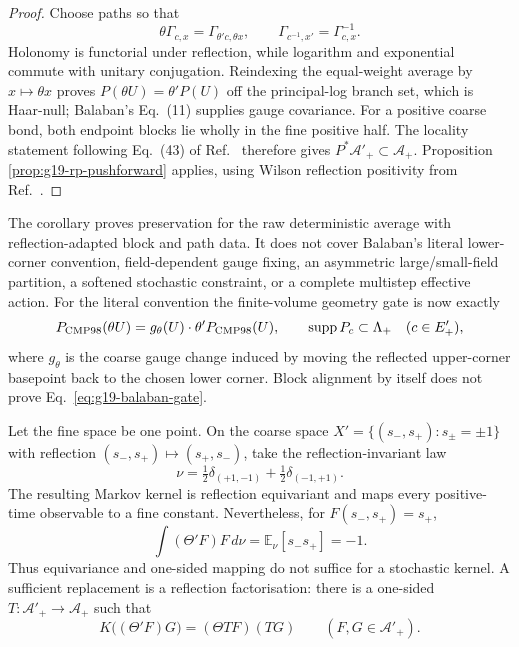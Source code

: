 \begin{proof}
Choose paths so that
\[
 \theta\Gamma_{c,x}=\Gamma_{\theta'c,\theta x},
 \qquad \Gamma_{c^{-1},x'}=\Gamma_{c,x}^{-1}.
\]
Holonomy is functorial under reflection, while logarithm and exponential
commute with unitary conjugation.  Reindexing the equal-weight average by
$x\mapsto\theta x$ proves $P(\theta U)=\theta'P(U)$ off the principal-log
branch set, which is Haar-null; Balaban's Eq.~(11) supplies gauge covariance.
For a positive coarse bond, both endpoint blocks lie wholly in the fine
positive half.  The locality statement following Eq.~(43) of
Ref.~\cite{Balaban1985Averaging} therefore gives
$P^*\mathcal A'_+\subset\mathcal A_+$.  Proposition
\ref{prop:g19-rp-pushforward} applies, using Wilson reflection positivity from
Ref.~\cite{OsterwalderSeiler1978}.
\end{proof}

The corollary proves preservation for the raw deterministic average with
reflection-adapted block and path data.  It does not cover Balaban's literal
lower-corner convention, field-dependent gauge fixing, an asymmetric
large/small-field partition, a softened stochastic constraint, or a complete
multistep effective action.  For the literal convention the finite-volume
geometry gate is now exactly
\begin{equation}
 P_{\rm CMP98}(\theta U)
 =g_\theta(U)\cdot\theta'P_{\rm CMP98}(U),
 \qquad
 \operatorname{supp}P_c\subset\Lambda_+
 \quad(c\in E'_+),
 \label{eq:g19-balaban-gate}
\end{equation}
where $g_\theta$ is the coarse gauge change induced by moving the reflected
upper-corner basepoint back to the chosen lower corner.  Block alignment by
itself does not prove Eq.~\eqref{eq:g19-balaban-gate}.

\begin{remark}
\label{rem:g19-markov-counterexample}
Let the fine space be one point.  On the coarse space
$X'=\{(s_-,s_+):s_\pm=\pm1\}$ with reflection
$(s_-,s_+)\mapsto(s_+,s_-)$, take the reflection-invariant law
\[
 \nu=\tfrac12\delta_{(+1,-1)}+\tfrac12\delta_{(-1,+1)}.
\]
The resulting Markov kernel is reflection equivariant and maps every
positive-time observable to a fine constant.  Nevertheless, for
$F(s_-,s_+)=s_+$,
\[
 \int(\Theta'F)F\,d\nu=\mathbb E_\nu[s_-s_+]=-1.
\]
Thus equivariance and one-sided mapping do not suffice for a stochastic
kernel.  A sufficient replacement is a reflection factorisation: there is a
one-sided $T:\mathcal A'_+\to\mathcal A_+$ such that
\[
 K\bigl((\Theta'F)G\bigr)=(\Theta TF)(TG)
 \qquad(F,G\in\mathcal A'_+).
\]
\end{remark}

